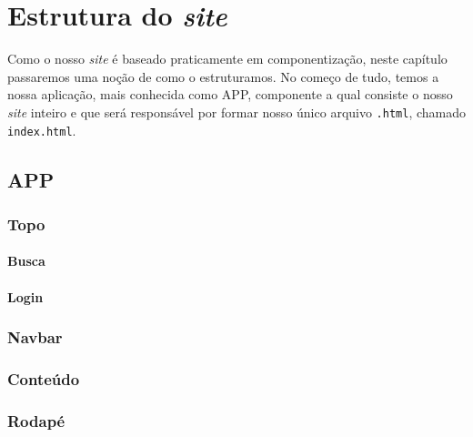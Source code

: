 \chapter{Estrutura do \emph{site}}
Como o nosso \emph{site} é baseado praticamente em componentização, neste
capítulo passaremos uma noção de como o estruturamos. No começo de tudo, temos a
nossa aplicação, mais conhecida como APP, componente a qual consiste o nosso
\emph{site} inteiro e que será responsável por formar nosso único arquivo
\texttt{.html}, chamado \texttt{index.html}.

\section{APP}
\subsection{Topo}
\subsubsection{Busca}
\subsubsection{Login}
\subsection{Navbar}
\subsection{Conteúdo}
\subsection{Rodapé}
